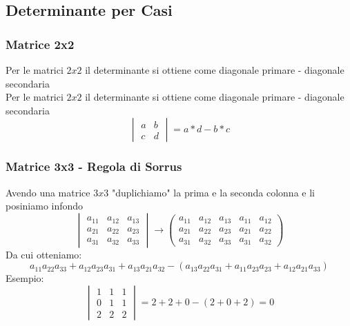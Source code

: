 \subsection{Determinante per Casi}

\subsubsection{Matrice 2x2}
Per le matrici $2x2$ il determinante si ottiene come diagonale primare - diagonale secondaria\\
Per le matrici $2x2$ il determinante si ottiene come diagonale primare - diagonale secondaria\\
\begin{equation}
\begin{vmatrix}
a & b \\
c & d
\end{vmatrix}
= a*d - b*c
\end{equation}

\subsubsection{Matrice 3x3 - Regola di Sorrus}
Avendo una matrice $3x3$ "duplichiamo" la prima e la seconda colonna  e li posiniamo infondo
$$
\begin{vmatrix}
a_{11} & a_{12} & a_{13}\\
a_{21} & a_{22} & a_{23}\\
a_{31} & a_{32} & a_{33}
\end{vmatrix}
\rightarrow
\begin{pmatrix}
a_{11} & a_{12} & a_{13} & a_{11} & a_{12}\\
a_{21} & a_{22} & a_{23} & a_{21} & a_{22}\\
a_{31} & a_{32} & a_{33} & a_{31} & a_{32}
\end{pmatrix}
$$
Da cui otteniamo:
$$ a_{11}a_{22}a_{33} + a_{12}a_{23}a_{31} + a_{13}a_{21}a_{32} - (a_{13}a_{22}a_{31} + a_{11}a_{23}a_{23} + a_{12}a_{21}a_{33})$$
Esempio:
$$ 
\begin{vmatrix}
1 & 1 & 1 \\
0 & 1 & 1 \\
2 & 2 & 2
\end{vmatrix}
= 2+2+0-(2+0+2) = 0
$$

